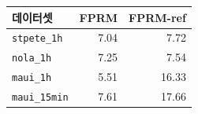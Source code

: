 \begin{tabular}{lrr}
\toprule
데이터셋 & FPRM & FPRM-ref \\
\midrule
\texttt{stpete\_1h} & 7.04 & 7.72 \\
\texttt{nola\_1h} & 7.25 & 7.54 \\
\texttt{maui\_1h} & 5.51 & 16.33 \\
\texttt{maui\_15min} & 7.61 & 17.66 \\
\bottomrule
\end{tabular}

